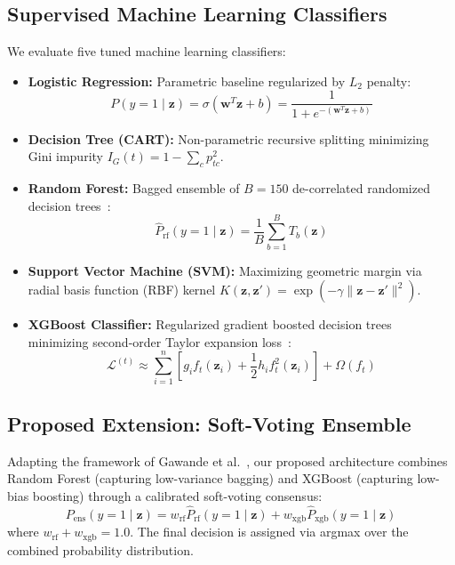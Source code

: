 \documentclass{COMPXXXX}
\begin{document}
\subsection{Supervised Machine Learning Classifiers}
We evaluate five tuned machine learning classifiers:
\begin{itemize}
    \item \textbf{Logistic Regression:} Parametric baseline regularized by $L_2$ penalty:
    \begin{equation}
    P(y=1 \mid \mathbf{z}) = \sigma(\mathbf{w}^T \mathbf{z} + b) = \frac{1}{1 + e^{-(\mathbf{w}^T \mathbf{z} + b)}}
    \end{equation}
    \item \textbf{Decision Tree (CART):} Non-parametric recursive splitting minimizing Gini impurity $I_G(t) = 1 - \sum_{c} p_{tc}^2$.
    \item \textbf{Random Forest:} Bagged ensemble of $B=150$ de-correlated randomized decision trees~\cite{breiman2001}:
    \begin{equation}
    \hat{P}_{\text{rf}}(y=1 \mid \mathbf{z}) = \frac{1}{B} \sum_{b=1}^B T_b(\mathbf{z})
    \end{equation}
    \item \textbf{Support Vector Machine (SVM):} Maximizing geometric margin via radial basis function (RBF) kernel $K(\mathbf{z}, \mathbf{z}') = \exp(-\gamma \|\mathbf{z} - \mathbf{z}'\|^2)$.
    \item \textbf{XGBoost Classifier:} Regularized gradient boosted decision trees minimizing second-order Taylor expansion loss~\cite{chen2016}:
    \begin{equation}
    \mathcal{L}^{(t)} \approx \sum_{i=1}^n \left[ g_i f_t(\mathbf{z}_i) + \frac{1}{2} h_i f_t^2(\mathbf{z}_i) \right] + \Omega(f_t)
    \end{equation}
\end{itemize}

\subsection{Proposed Extension: Soft-Voting Ensemble}
Adapting the framework of Gawande et al.~\cite{gawande2026}, our proposed architecture combines Random Forest (capturing low-variance bagging) and XGBoost (capturing low-bias boosting) through a calibrated soft-voting consensus:
\begin{equation}
P_{\text{ens}}(y=1 \mid \mathbf{z}) = w_{\text{rf}} \hat{P}_{\text{rf}}(y=1 \mid \mathbf{z}) + w_{\text{xgb}} \hat{P}_{\text{xgb}}(y=1 \mid \mathbf{z})
\end{equation}
where $w_{\text{rf}} + w_{\text{xgb}} = 1.0$. The final decision is assigned via argmax over the combined probability distribution.
\end{document}
